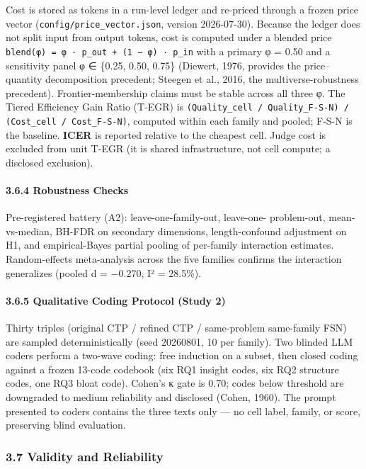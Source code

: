 \documentclass[11pt,a4paper]{article}
\begin{document}
Cost is stored as tokens in a run-level ledger and re-priced through a
frozen price vector (\texttt{config/price\_vector.json}, version 2026-07-30).
Because the ledger does not split input from output tokens, cost is
computed under a blended price
\texttt{blend(φ) = φ · p\_out + (1 − φ) · p\_in} with a primary φ = 0.50 and a
sensitivity panel φ ∈ \{0.25, 0.50, 0.75\} (Diewert, 1976, provides the
price–quantity decomposition precedent; Steegen et al., 2016, the
multiverse-robustness precedent). Frontier-membership claims must be
stable across all three φ. The \textit{}Tiered Efficiency Gain Ratio
(T-EGR)\textit{} is \texttt{(Quality\_cell / Quality\_F-S-N) / (Cost\_cell / Cost\_F-S-N)},
computed within each family and pooled; F-S-N is the baseline.
\textbf{ICER} is reported relative to the cheapest cell. Judge cost is
excluded from unit T-EGR (it is shared infrastructure, not cell
compute; a disclosed exclusion).

\paragraph{3.6.4 Robustness Checks}

Pre-registered battery (A2): leave-one-family-out, leave-one-
problem-out, mean-vs-median, BH-FDR on secondary dimensions,
length-confound adjustment on H1, and empirical-Bayes partial
pooling of per-family interaction estimates. Random-effects
meta-analysis across the five families confirms the interaction
generalizes (pooled d = −0.270, I² = 28.5\%).

\paragraph{3.6.5 Qualitative Coding Protocol (Study 2)}

Thirty triples (original CTP / refined CTP / same-problem same-family
FSN) are sampled deterministically (seed 20260801, 10 per family).
Two blinded LLM coders perform a two-wave coding: free induction on
a subset, then closed coding against a frozen 13-code codebook
(six RQ1 insight codes, six RQ2 structure codes, one RQ3 bloat code).
Cohen's κ gate is 0.70; codes below threshold are downgraded to
medium reliability and disclosed (Cohen, 1960). The prompt presented
to coders contains the three texts only — no cell label, family, or
score, preserving blind evaluation.

\subsubsection{3.7 Validity and Reliability}
\end{document}
